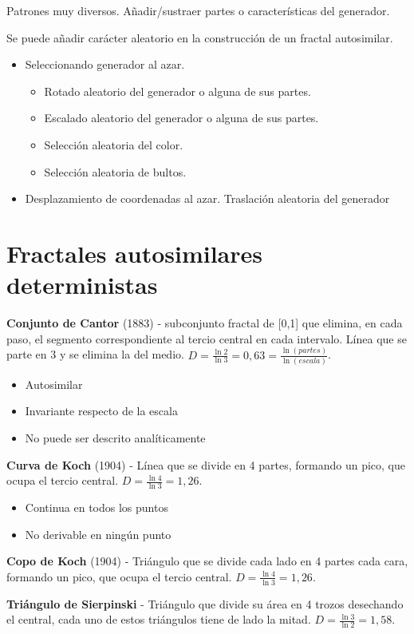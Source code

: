 Patrones muy diversos. Añadir/sustraer partes o características del generador.

Se puede añadir carácter aleatorio en la construcción de un fractal autosimilar.
\begin{itemize}
    \item Seleccionando generador al azar.
    \begin{itemize}
        \item Rotado aleatorio del generador o alguna de sus partes.
        \item Escalado aleatorio del generador o alguna de sus partes.
        \item Selección aleatoria del color.
        \item Selección aleatoria de bultos.
    \end{itemize}
    \item Desplazamiento de coordenadas al azar. Traslación aleatoria del generador
\end{itemize}

\section{Fractales autosimilares deterministas}
\textbf{Conjunto de Cantor} (1883) - subconjunto fractal de [0,1] que elimina, en cada paso, el segmento correspondiente al tercio central en cada intervalo. Línea que se parte en 3 y se elimina la del medio. $D=\frac{\ln 2}{\ln 3}= 0,63=\frac{\ln (partes)}{\ln (escala)}$.
\begin{itemize}
    \item Autosimilar
    \item Invariante respecto de la escala
    \item No puede ser descrito analíticamente
\end{itemize}

\textbf{Curva de Koch} (1904) - Línea que se divide en 4 partes, formando un pico, que ocupa el tercio central. $D=\frac{\ln 4}{\ln 3}=1,26$.
\begin{itemize}
    \item Continua en todos los puntos
    \item No derivable en ningún punto
\end{itemize}

\textbf{Copo de Koch} (1904) - Triángulo que se divide cada lado en 4 partes cada cara, formando un pico, que ocupa el tercio central. $D=\frac{\ln 4}{\ln 3}=1,26$.

\textbf{Triángulo de Sierpinski} - Triángulo que divide su área en 4 trozos desechando el central, cada uno de estos triángulos tiene de lado la mitad. $D=\frac{\ln 3}{\ln 2}=1,58$.

